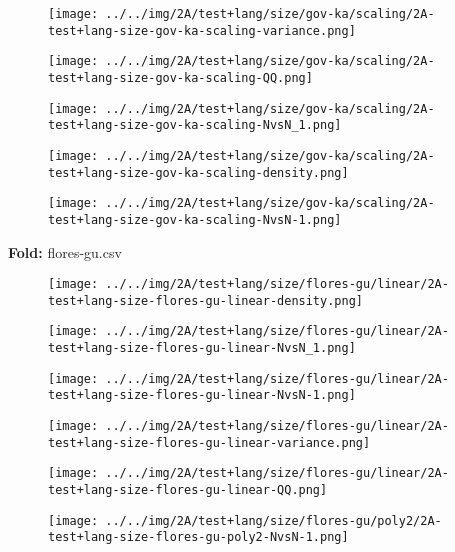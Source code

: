 \begin{figure}[H]
\centering	\texttt{[image: ../../img/2A/test+lang/size/gov-ka/scaling/2A-test+lang-size-gov-ka-scaling-variance.png]}
\end{figure}
\begin{figure}[H]
\centering	\texttt{[image: ../../img/2A/test+lang/size/gov-ka/scaling/2A-test+lang-size-gov-ka-scaling-QQ.png]}
\end{figure}
\begin{figure}[H]
\centering	\texttt{[image: ../../img/2A/test+lang/size/gov-ka/scaling/2A-test+lang-size-gov-ka-scaling-NvsN\_1.png]}
\end{figure}
\begin{figure}[H]
\centering	\texttt{[image: ../../img/2A/test+lang/size/gov-ka/scaling/2A-test+lang-size-gov-ka-scaling-density.png]}
\end{figure}
\begin{figure}[H]
\centering	\texttt{[image: ../../img/2A/test+lang/size/gov-ka/scaling/2A-test+lang-size-gov-ka-scaling-NvsN-1.png]}
\end{figure}
\textbf{Fold:} flores-gu.csv
\begin{figure}[H]
\centering	\texttt{[image: ../../img/2A/test+lang/size/flores-gu/linear/2A-test+lang-size-flores-gu-linear-density.png]}
\end{figure}
\begin{figure}[H]
\centering	\texttt{[image: ../../img/2A/test+lang/size/flores-gu/linear/2A-test+lang-size-flores-gu-linear-NvsN\_1.png]}
\end{figure}
\begin{figure}[H]
\centering	\texttt{[image: ../../img/2A/test+lang/size/flores-gu/linear/2A-test+lang-size-flores-gu-linear-NvsN-1.png]}
\end{figure}
\begin{figure}[H]
\centering	\texttt{[image: ../../img/2A/test+lang/size/flores-gu/linear/2A-test+lang-size-flores-gu-linear-variance.png]}
\end{figure}
\begin{figure}[H]
\centering	\texttt{[image: ../../img/2A/test+lang/size/flores-gu/linear/2A-test+lang-size-flores-gu-linear-QQ.png]}
\end{figure}
\begin{figure}[H]
\centering	\texttt{[image: ../../img/2A/test+lang/size/flores-gu/poly2/2A-test+lang-size-flores-gu-poly2-NvsN-1.png]}
\end{figure}
